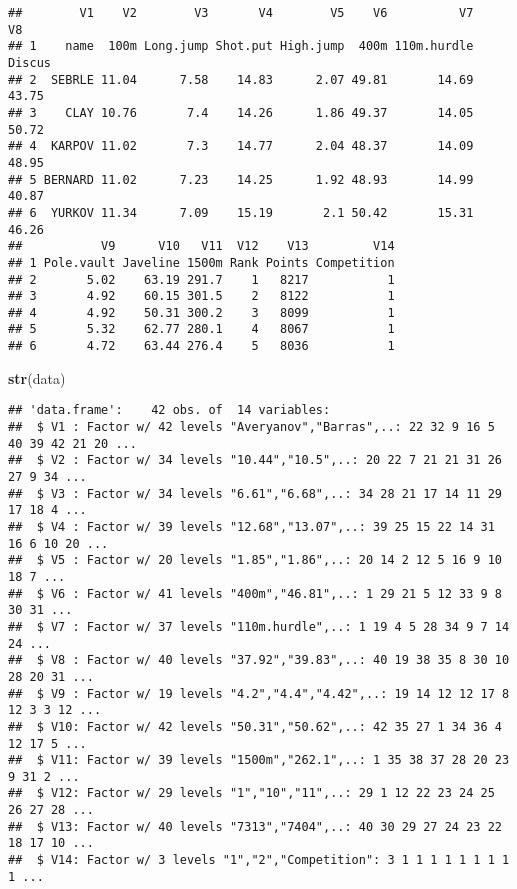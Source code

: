 \documentclass[]{article}
\newenvironment{Shaded}{\begin{snugshade}}{\end{snugshade}}
\newcommand{\KeywordTok}[1]{\textcolor[rgb]{0.13,0.29,0.53}{\textbf{#1}}}
\newcommand{\NormalTok}[1]{#1}
\begin{document}
\begin{verbatim}
##        V1    V2        V3       V4        V5    V6          V7     V8
## 1    name  100m Long.jump Shot.put High.jump  400m 110m.hurdle Discus
## 2  SEBRLE 11.04      7.58    14.83      2.07 49.81       14.69  43.75
## 3    CLAY 10.76       7.4    14.26      1.86 49.37       14.05  50.72
## 4  KARPOV 11.02       7.3    14.77      2.04 48.37       14.09  48.95
## 5 BERNARD 11.02      7.23    14.25      1.92 48.93       14.99  40.87
## 6  YURKOV 11.34      7.09    15.19       2.1 50.42       15.31  46.26
##           V9      V10   V11  V12    V13         V14
## 1 Pole.vault Javeline 1500m Rank Points Competition
## 2       5.02    63.19 291.7    1   8217           1
## 3       4.92    60.15 301.5    2   8122           1
## 4       4.92    50.31 300.2    3   8099           1
## 5       5.32    62.77 280.1    4   8067           1
## 6       4.72    63.44 276.4    5   8036           1
\end{verbatim}

\begin{Shaded}
\begin{Highlighting}[]
\KeywordTok{str}\NormalTok{(data)}
\end{Highlighting}
\end{Shaded}

\begin{verbatim}
## 'data.frame':    42 obs. of  14 variables:
##  $ V1 : Factor w/ 42 levels "Averyanov","Barras",..: 22 32 9 16 5 40 39 42 21 20 ...
##  $ V2 : Factor w/ 34 levels "10.44","10.5",..: 20 22 7 21 21 31 26 27 9 34 ...
##  $ V3 : Factor w/ 34 levels "6.61","6.68",..: 34 28 21 17 14 11 29 17 18 4 ...
##  $ V4 : Factor w/ 39 levels "12.68","13.07",..: 39 25 15 22 14 31 16 6 10 20 ...
##  $ V5 : Factor w/ 20 levels "1.85","1.86",..: 20 14 2 12 5 16 9 10 18 7 ...
##  $ V6 : Factor w/ 41 levels "400m","46.81",..: 1 29 21 5 12 33 9 8 30 31 ...
##  $ V7 : Factor w/ 37 levels "110m.hurdle",..: 1 19 4 5 28 34 9 7 14 24 ...
##  $ V8 : Factor w/ 40 levels "37.92","39.83",..: 40 19 38 35 8 30 10 28 20 31 ...
##  $ V9 : Factor w/ 19 levels "4.2","4.4","4.42",..: 19 14 12 12 17 8 12 3 3 12 ...
##  $ V10: Factor w/ 42 levels "50.31","50.62",..: 42 35 27 1 34 36 4 12 17 5 ...
##  $ V11: Factor w/ 39 levels "1500m","262.1",..: 1 35 38 37 28 20 23 9 31 2 ...
##  $ V12: Factor w/ 29 levels "1","10","11",..: 29 1 12 22 23 24 25 26 27 28 ...
##  $ V13: Factor w/ 40 levels "7313","7404",..: 40 30 29 27 24 23 22 18 17 10 ...
##  $ V14: Factor w/ 3 levels "1","2","Competition": 3 1 1 1 1 1 1 1 1 1 ...
\end{verbatim}
\end{document}
